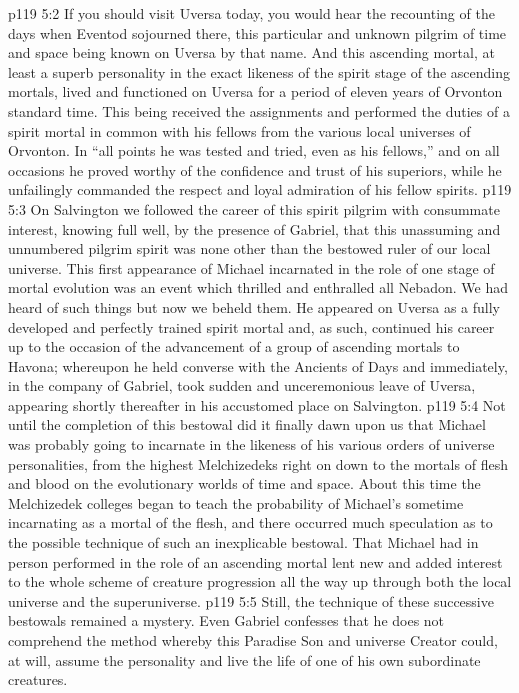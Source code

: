 \vs p119 5:2 If you should visit Uversa today, you would hear the recounting of the days when Eventod sojourned there, this particular and unknown pilgrim of time and space being known on Uversa by that name. And this ascending mortal, at least a superb personality in the exact likeness of the spirit stage of the ascending mortals, lived and functioned on Uversa for a period of eleven years of Orvonton standard time. This being received the assignments and performed the duties of a spirit mortal in common with his fellows from the various local universes of Orvonton. In “all points he was tested and tried, even as his fellows,” and on all occasions he proved worthy of the confidence and trust of his superiors, while he unfailingly commanded the respect and loyal admiration of his fellow spirits.
\vs p119 5:3 On Salvington we followed the career of this spirit pilgrim with consummate interest, knowing full well, by the presence of Gabriel, that this unassuming and unnumbered pilgrim spirit was none other than the bestowed ruler of our local universe. This first appearance of Michael incarnated in the role of one stage of mortal evolution was an event which thrilled and enthralled all Nebadon. We had heard of such things but now we beheld them. He appeared on Uversa as a fully developed and perfectly trained spirit mortal and, as such, continued his career up to the occasion of the advancement of a group of ascending mortals to Havona; whereupon he held converse with the Ancients of Days and immediately, in the company of Gabriel, took sudden and unceremonious leave of Uversa, appearing shortly thereafter in his accustomed place on Salvington.
\pc \vs p119 5:4 Not until the completion of this bestowal did it finally dawn upon us that Michael was probably going to incarnate in the likeness of his various orders of universe personalities, from the highest Melchizedeks right on down to the mortals of flesh and blood on the evolutionary worlds of time and space. About this time the Melchizedek colleges began to teach the probability of Michael’s sometime incarnating as a mortal of the flesh, and there occurred much speculation as to the possible technique of such an inexplicable bestowal. That Michael had in person performed in the role of an ascending mortal lent new and added interest to the whole scheme of creature progression all the way up through both the local universe and the superuniverse.
\vs p119 5:5 Still, the technique of these successive bestowals remained a mystery. Even Gabriel confesses that he does not comprehend the method whereby this Paradise Son and universe Creator could, at will, assume the personality and live the life of one of his own subordinate creatures.
